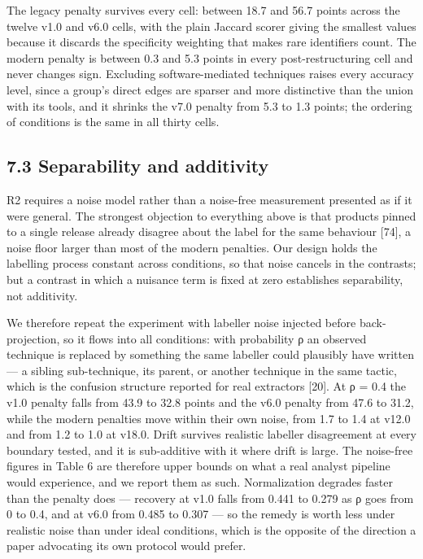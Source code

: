 \documentclass[11pt,a4paper]{article}
\begin{document}
The legacy penalty survives every cell: between 18.7 and 56.7 points across the twelve v1.0 and v6.0 cells, with the plain Jaccard scorer giving the smallest values because it discards the specificity weighting that makes rare identifiers count. The modern penalty is between 0.3 and 5.3 points in every post-restructuring cell and never changes sign. Excluding software-mediated techniques raises every accuracy level, since a group's direct edges are sparser and more distinctive than the union with its tools, and it shrinks the v7.0 penalty from 5.3 to 1.3 points; the ordering of conditions is the same in all thirty cells.

\subsection{7.3 Separability and additivity}

R2 requires a noise model rather than a noise-free measurement presented as if it were general. The strongest objection to everything above is that products pinned to a single release already disagree about the label for the same behaviour [74], a noise floor larger than most of the modern penalties. Our design holds the labelling process constant across conditions, so that noise cancels in the contrasts; but a contrast in which a nuisance term is fixed at zero establishes separability, not additivity.

We therefore repeat the experiment with labeller noise injected before back-projection, so it flows into all conditions: with probability ρ an observed technique is replaced by something the same labeller could plausibly have written — a sibling sub-technique, its parent, or another technique in the same tactic, which is the confusion structure reported for real extractors [20]. At ρ = 0.4 the v1.0 penalty falls from 43.9 to 32.8 points and the v6.0 penalty from 47.6 to 31.2, while the modern penalties move within their own noise, from 1.7 to 1.4 at v12.0 and from 1.2 to 1.0 at v18.0. Drift survives realistic labeller disagreement at every boundary tested, and it is sub-additive with it where drift is large. The noise-free figures in Table 6 are therefore upper bounds on what a real analyst pipeline would experience, and we report them as such. Normalization degrades faster than the penalty does — recovery at v1.0 falls from 0.441 to 0.279 as ρ goes from 0 to 0.4, and at v6.0 from 0.485 to 0.307 — so the remedy is worth less under realistic noise than under ideal conditions, which is the opposite of the direction a paper advocating its own protocol would prefer.
\end{document}
